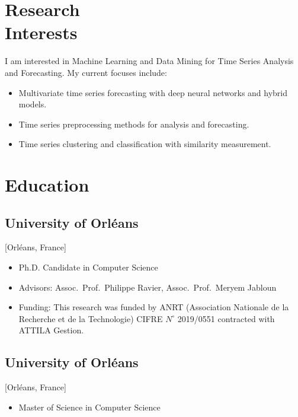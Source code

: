 \documentclass{mycv}
\begin{document}
\maketitle%

\section{Research \\ Interests}

I am interested in Machine Learning and Data Mining for Time Series Analysis and Forecasting. My current focuses include:

\begin{itemize}
  \item Multivariate time series forecasting with deep neural networks and hybrid models.
  \item Time series preprocessing methods for analysis and forecasting.
  \item Time series clustering and classification with similarity measurement.
\end{itemize}

\section{Education}

\subsection{University of Orl\'eans}[Orl\'eans, France]
\begin{itemize}[label={}]
  \item Ph.D. Candidate in Computer Science 
  \item Advisors: Assoc.~Prof.~Philippe Ravier, Assoc.~Prof.~Meryem Jabloun
  \item Funding: This research was funded by ANRT (Association Nationale de la Recherche et de la Technologie) CIFRE $N^{\circ}$ 2019/0551 contracted with ATTILA Gestion.
\end{itemize}

\subsection{University of Orl\'eans}[Orl\'eans, France]
\begin{itemize}[label={}]
  \item Master of Science in Computer Science 
\end{itemize}
\end{document}
